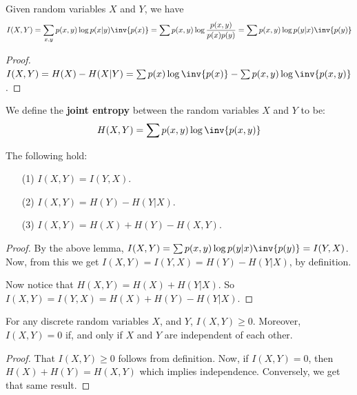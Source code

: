 \begin{lemma}\label{2.1.5}
    Given random variables $X$ and  $Y$, we have
    \begin{equation}
        I(X,Y)=\sum_{x,y}{p(x,y)\log{p(x|y)\inv{p(x)}}}=\sum{p(x,y)\log{\frac{p(x,
        y)}{p(x)p(y)}}}=\sum{p(x,y)\log{p(y|x)\inv{p(y)}}}
    \end{equation}
\end{lemma}
\begin{proof}
    $I(X,Y)=H(X)-H(X|Y)=\sum{p(x)\log{\inv{p(x)}}}-\sum{p(x,y)\log{\inv{p(x,y)}}}$.
\end{proof}

\begin{definition}
    We define the \textbf{joint entropy} between the random variables $X$ and
    $Y$ to be:
    \begin{equation}
        H(X,Y)=\sum{p(x,y)\log{\inv{p(x,y)}}}
    \end{equation}
\end{definition}

\begin{lemma}\label{2.1.6}
    The following hold:
    \begin{enumerate}
        \item[(1)] $I(X,Y)=I(Y,X)$.

        \item[(2)] $I(X,Y)=H(Y)-H(Y|X)$.

        \item[(3)] $I(X,Y)=H(X)+H(Y)-H(X,Y)$.
    \end{enumerate}
\end{lemma}
\begin{proof}
    By the above lemma, $I(X,Y)=\sum{p(x,y)\log{p(y|x)\inv{p(y)}}}=I(Y,X)$. Now,
    from this we get $I(X,Y)=I(Y,X)=H(Y)-H(Y|X)$, by definition.

    Now notice that $H(X,Y)=H(X)+H(Y|X)$. So $I(X,Y)=I(Y,X)=H(X)+H(Y)-H(Y|X)$.
\end{proof}

\begin{lemma}\label{2.1.7}
    For any discrete random variables $X$, and  $Y$,  $I(X,Y) \geq 0$. Moreover,
    $I(X,Y)=0$ if, and only if $X$ and  $Y$ are independent of each other.
\end{lemma}
\begin{proof}
    That $I(X,Y) \geq 0$ follows from definition. Now, if $I(X,Y)=0$, then
    $H(X)+H(Y)=H(X,Y)$ which implies independence. Conversely, we get that same
    result.
\end{proof}

